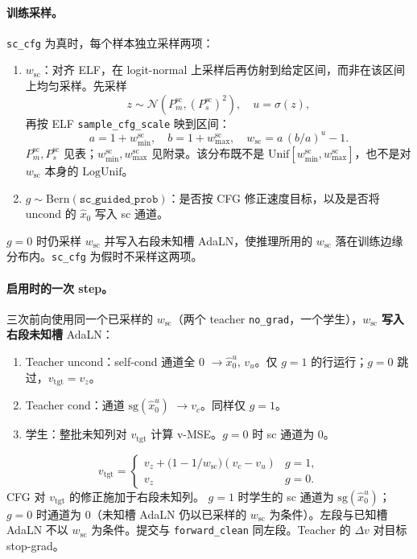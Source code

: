 \documentclass[UTF8,a4paper,11pt]{ctexart}
\begin{document}
\paragraph{训练采样。}
\texttt{sc\_cfg} 为真时，每个样本独立采样两项：
\begin{enumerate}
  \item \(w_{\mathrm{sc}}\)：对齐 ELF，在 logit-normal 上采样后再仿射到给定区间，而非在该区间上均匀采样。先采样
  \[
  z\sim\mathcal{N}(P_m^{\mathrm{sc}},(P_s^{\mathrm{sc}})^2),\quad
  u=\sigma(z),
  \]
  再按 ELF \texttt{sample\_cfg\_scale} 映到区间：
  \[
  a=1+w^{\mathrm{sc}}_{\min},\quad b=1+w^{\mathrm{sc}}_{\max},\quad
  w_{\mathrm{sc}}=a\,(b/a)^{u}-1.
  \]
  \(P_m^{\mathrm{sc}},P_s^{\mathrm{sc}}\) 见表；\(w^{\mathrm{sc}}_{\min},w^{\mathrm{sc}}_{\max}\) 见附录。该分布既不是 \(\mathrm{Unif}[w^{\mathrm{sc}}_{\min},w^{\mathrm{sc}}_{\max}]\)，也不是对 \(w_{\mathrm{sc}}\) 本身的 \(\mathrm{LogUnif}\)。
  \item \(g\sim\mathrm{Bern}(\texttt{sc\_guided\_prob})\)：是否按 CFG 修正速度目标，以及是否将 uncond 的 \(\hat x_0\) 写入 sc 通道。
\end{enumerate}
\(g=0\) 时仍采样 \(w_{\mathrm{sc}}\) 并写入右段未知槽 AdaLN，使推理所用的 \(w_{\mathrm{sc}}\) 落在训练边缘分布内。\texttt{sc\_cfg} 为假时不采样这两项。

\paragraph{启用时的一次 step。}
三次前向使用同一个已采样的 \(w_{\mathrm{sc}}\)（两个 teacher \texttt{no\_grad}，一个学生），\(w_{\mathrm{sc}}\) \textbf{写入右段未知槽} AdaLN：

\begin{enumerate}
  \item Teacher uncond：self-cond 通道全 \(0\) \(\to\hat x_0^{u},\,v_u\)。仅 \(g=1\) 的行运行；\(g=0\) 跳过，\(v_{\mathrm{tgt}}=v_z\)。
  \item Teacher cond：通道 \(\mathrm{sg}(\hat x_0^{u})\) \(\to v_c\)。同样仅 \(g=1\)。
  \item 学生：整批未知列对 \(v_{\mathrm{tgt}}\) 计算 v-MSE。\(g=0\) 时 sc 通道为 \(0\)。
\end{enumerate}

\[
v_{\mathrm{tgt}}=\begin{cases}
v_z+\bigl(1-1/w_{\mathrm{sc}}\bigr)(v_c-v_u) & g=1,\\
v_z & g=0.
\end{cases}
\]
CFG 对 \(v_{\mathrm{tgt}}\) 的修正施加于右段未知列。
\(g=1\) 时学生的 sc 通道为 \(\mathrm{sg}(\hat x_0^{u})\)；\(g=0\) 时通道为 \(0\)（未知槽 AdaLN 仍以已采样的 \(w_{\mathrm{sc}}\) 为条件）。左段与已知槽 AdaLN 不以 \(w_{\mathrm{sc}}\) 为条件。提交与 \texttt{forward\_clean} 同左段。Teacher 的 \(\Delta v\) 对目标 stop-grad。
\end{document}
